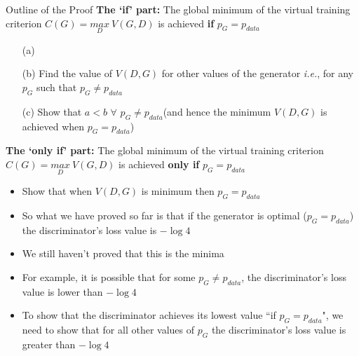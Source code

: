\begin{frame}
	\begin{block}{Outline of the Proof}
	\textbf{The `if' part:} The global minimum of the virtual training criterion $C(G)=\underset{D}{max} ~V(G,D)$ is achieved \textbf{if} $p_G=p_{data}$
		\begin{enumerate}
			\item[(a)]  \color{black}
			\item[(b)] \alert<2>{Find the value of $V(D,G)$ for other values of the generator \textit{i.e.}, for any $p_G$ such that $p_G \neq p_{data}$}
			\item[(c)] Show that $a < b$ $\forall$ $p_G \neq p_{data}$(and hence the minimum $V(D,G)$ is achieved when $p_G=p_{data}$)
		\end{enumerate}
	\vspace{5mm}
	\textbf{The `only if' part:} The global minimum of the virtual training criterion $C(G)=\underset{D}{max} ~V(G,D)$ is achieved \textbf{only if} $p_G=p_{data}$
	\begin{itemize}
		\item Show that when $V(D,G)$ is minimum then $p_G=p_{data}$
	\end{itemize}
	\end{block}
\end{frame}

\begin{frame}
	\begin{itemize}[<+->]
		\item So what we have proved so far is that if the generator is optimal ($p_G = p_{data}$) the discriminator's loss value is $-\log 4$
		\item We still haven't proved that this is the minima
		\item For example, it is possible that for some $p_G \neq p_{data}$, the discriminator's loss value is lower than $-\log 4$
		\item To show that the discriminator achieves its lowest value ``if $p_G = p_{data}$", we need to show that for all other values of $p_G$ the discriminator's loss value is greater than $-\log 4$
	\end{itemize}
\end{frame}

